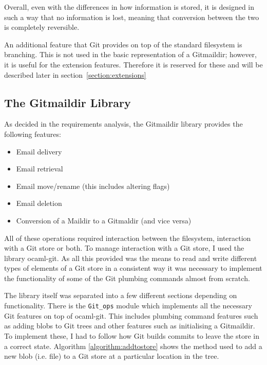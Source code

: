 Overall, even with the differences in how information is stored, it is designed in such a way that no information is lost, meaning that conversion between the two is completely reversible.

An additional feature that Git provides on top of the standard filesystem is branching. This is not used in the basic representation of a Gitmaildir; however, it is useful for the extension features. Therefore it is reserved for these and will be described later in section~\ref{section:extensions}

\subsection{The Gitmaildir Library}

As decided in the requirements analysis, the Gitmaildir library provides the following features:

\begin{itemize}
\item Email delivery
\item Email retrieval
\item Email move/rename (this includes altering flags)
\item Email deletion
\item Conversion of a Maildir to a Gitmaldir (and vice versa)
\end{itemize}

All of these operations required interaction between the filesystem, interaction with a Git store or both. To manage interaction with a Git store, I used the library ocaml-git. As all this provided was the means to read and write different types of elements of a Git store in a consistent way it was necessary to implement the functionality of some of the Git plumbing commands almost from scratch.

The library itself was separated into a few different sections depending on functionality. There is the \texttt{Git\_ops} module which implements all the necessary Git features on top of ocaml-git. This includes plumbing command features such as adding blobs to Git trees and other features such as initialising a Gitmaildir. To implement these, I had to follow how Git builds commits to leave the store in a correct state. Algorithm \ref{algorithm:addtostore} shows the method used to add a new blob (i.e. file) to a Git store at a particular location in the tree.

